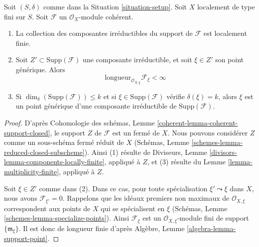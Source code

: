 \begin{lemma}
\label{lemma-length-finite}
Soit $(S, \delta)$ comme dans la Situation \ref{situation-setup}.
Soit $X$ localement de type fini sur $S$.
Soit $\mathcal{F}$ un $\mathcal{O}_X$-module cohérent.
\begin{enumerate}
\item La collection des composantes irréductibles du support de
$\mathcal{F}$ est localement finie.
\item Soit $Z' \subset \text{Supp}(\mathcal{F})$
une composante irréductible, et
soit $\xi \in Z'$ son point générique.
Alors
$$
\text{longueur}_{\mathcal{O}_{X, \xi}} \mathcal{F}_\xi < \infty
$$
\item Si $\dim_\delta(\text{Supp}(\mathcal{F})) \leq k$
et si $\xi \in \text{Supp}(\mathcal{F})$ vérifie $\delta(\xi) = k$, alors $\xi$ est un
point générique d'une composante irréductible de $\text{Supp}(\mathcal{F})$.
\end{enumerate}
\end{lemma}

\begin{proof}
D'après Cohomologie des schémas, Lemme \ref{coherent-lemma-coherent-support-closed},
le support $Z$ de $\mathcal{F}$ est un fermé de $X$.
Nous pouvons considérer $Z$ comme un sous-schéma fermé réduit de $X$
(Schémas, Lemme \ref{schemes-lemma-reduced-closed-subscheme}).
Ainsi (1) résulte de
Diviseurs, Lemme \ref{divisors-lemma-components-locally-finite}, appliqué à $Z$,
et (3) résulte du
Lemme \ref{lemma-multiplicity-finite}, appliqué à $Z$.

\medskip\noindent
Soit $\xi \in Z'$ comme dans (2). Dans ce cas, pour toute spécialisation
$\xi' \leadsto \xi$ dans $X$, nous avons $\mathcal{F}_{\xi'} = 0$.
Rappelons que les idéaux premiers non maximaux de $\mathcal{O}_{X, \xi}$ correspondent
aux points de $X$ qui se spécialisent en $\xi$
(Schémas, Lemme \ref{schemes-lemma-specialize-points}).
Ainsi $\mathcal{F}_\xi$ est un $\mathcal{O}_{X, \xi}$-module fini
de support $\{\mathfrak m_\xi\}$. Il est donc de longueur finie
d'après Algèbre, Lemme \ref{algebra-lemma-support-point}.
\end{proof}

